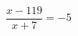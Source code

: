 \begin{ex}[type=equation]
	\begin{condition}
		\( \dfrac{x-119}{x+7}=-5 \)
	\end{condition}
\end{ex}